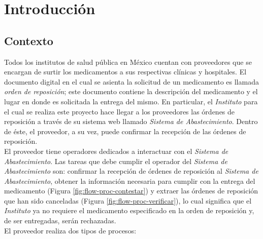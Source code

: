 \chapter{Introducción}\label{cap1}

\section{Contexto} \label{sec:intro-contexto}
Todos los institutos de salud pública en México cuentan con proveedores que se encargan de surtir los medicamentos a sus respectivas clínicas y hospitales. El documento digital en el cual se asienta la solicitud de un medicamento es llamada \textit{orden de reposición}; este documento contiene la descripción del medicamento y el lugar en donde es solicitada la entrega del mismo. En particular, el \textit{Instituto} para el cual se realiza este proyecto hace llegar a los proveedores las órdenes de reposición a través de su sistema web llamado \textit{Sistema de Abastecimiento}. Dentro de éste, el proveedor, a su vez, puede confirmar la recepción de las órdenes de reposición.\\
El proveedor tiene operadores dedicados a interactuar con el \textit{Sistema de Abastecimiento}. Las tareas que debe cumplir el operador del \textit{Sistema de Abastecimiento} son: confirmar la recepción de órdenes de reposición al \textit{Sistema de Abastecimiento}, obtener la información necesaria para cumplir con la entrega del medicamento (Figura \ref{fig:flow-proc-contestar}) y extraer las órdenes de reposición que han sido canceladas (Figura \ref{fig:flow-proc-verificar}), lo cual significa que el \textit{Instituto} ya no requiere el medicamento especificado en la orden de reposición y, de ser entregadas, serán rechazadas.\\
El proveedor realiza dos tipos de procesos:
